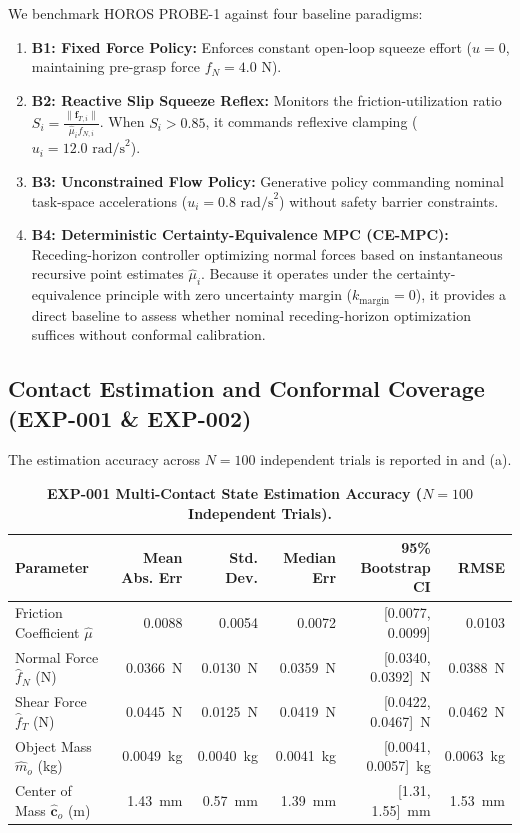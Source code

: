 We benchmark HOROS PROBE-1 against four baseline paradigms:
\begin{enumerate}
    \item \textbf{B1: Fixed Force Policy:} Enforces constant open-loop squeeze effort ($u = 0$, maintaining pre-grasp force $f_N = 4.0\text{ N}$).
    \item \textbf{B2: Reactive Slip Squeeze Reflex:} Monitors the friction-utilization ratio $S_i = \frac{\|\mathbf{f}_{T, i}\|}{\hat{\mu}_i f_{N, i}}$. When $S_i > 0.85$, it commands reflexive clamping ($u_i = 12.0\text{ rad/s}^2$).
    \item \textbf{B3: Unconstrained Flow Policy:} Generative policy commanding nominal task-space accelerations ($u_i = 0.8\text{ rad/s}^2$) without safety barrier constraints.
    \item \textbf{B4: Deterministic Certainty-Equivalence MPC (CE-MPC):} Receding-horizon controller optimizing normal forces based on instantaneous recursive point estimates $\hat{\mu}_i$. Because it operates under the certainty-equivalence principle with zero uncertainty margin ($k_{\text{margin}} = 0$), it provides a direct baseline to assess whether nominal receding-horizon optimization suffices without conformal calibration.
\end{enumerate}

\subsection{Contact Estimation and Conformal Coverage (EXP-001 \& EXP-002)}
The estimation accuracy across $N = 100$ independent trials is reported in  and (a).

\begin{table}[t]
\centering
\caption{\textbf{EXP-001 Multi-Contact State Estimation Accuracy ($N = 100$ Independent Trials).}}
\label{tab:estimation}
\small
\begin{tabular}{lrrrrr}
\toprule
\textbf{Parameter} & \textbf{Mean Abs. Err} & \textbf{Std. Dev.} & \textbf{Median Err} & \textbf{95\% Bootstrap CI} & \textbf{RMSE} \\
\midrule
Friction Coefficient $\hat{\mu}$ & 0.0088 & 0.0054 & 0.0072 & [0.0077, 0.0099] & 0.0103 \\
Normal Force $\hat{f}_N$ (N) & 0.0366~N & 0.0130~N & 0.0359~N & [0.0340, 0.0392]~N & 0.0388~N \\
Shear Force $\hat{f}_T$ (N) & 0.0445~N & 0.0125~N & 0.0419~N & [0.0422, 0.0467]~N & 0.0462~N \\
Object Mass $\hat{m}_o$ (kg) & 0.0049~kg & 0.0040~kg & 0.0041~kg & [0.0041, 0.0057]~kg & 0.0063~kg \\
Center of Mass $\hat{\mathbf{c}}_o$ (m) & 1.43~mm & 0.57~mm & 1.39~mm & [1.31, 1.55]~mm & 1.53~mm \\
\bottomrule
\end{tabular}
\end{table}


